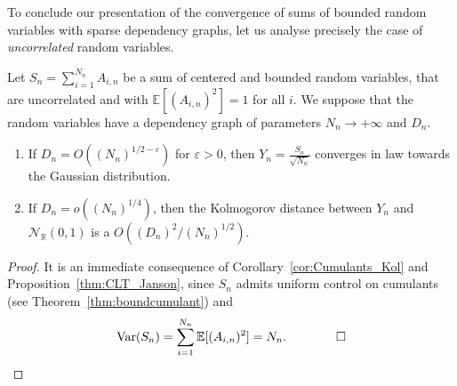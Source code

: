 \documentclass[envcountsame]{svmult}
\newcommand{\R}{\mathbb{R}}
\newcommand{\esper}{\mathbb{E}}
\newcommand{\eps}{\varepsilon}
\newcommand{\var}{\mathrm{Var}}
\newcommand{\gauss}{\mathcal{N}_{\R}(0,1)}
\begin{document}
To conclude our presentation of the convergence of sums of bounded random variables with sparse dependency graphs, let us analyse precisely the case of \emph{uncorrelated} random variables.
\begin{corollary}\label{cor:uncorrelated}
Let $S_n=\sum_{i=1}^{N_n} A_{i,n}$ be a sum of centered and bounded random variables, that are uncorrelated and with $\esper[(A_{i,n})^2]=1$ for all $i$. We suppose that the random variables have a dependency graph of parameters $N_n \to +\infty$ and $D_n$.
\begin{enumerate}
 	\item If $D_n = O((N_n)^{1/2-\eps})$ for $\eps>0$, then $Y_n=\frac{S_n}{\sqrt{N_n}}$ converges in law towards the Gaussian distribution. 
 	\item If $D_n = o((N_n)^{1/4})$, then the Kolmogorov distance between $Y_n$ and $\gauss$ is a $O((D_n)^2/(N_n)^{1/2})$.
 \end{enumerate}  
\end{corollary}

\begin{proof}
  It is an immediate consequence of Corollary~\ref{cor:Cumulants_Kol} and Proposition~\ref{thm:CLT_Janson},
  since $S_n$ admits uniform control on cumulants (see Theorem~\ref{thm:boundcumulant})
  and
  \begin{equation*}
  \var(S_n) = \sum_{i=1}^{N_n} \esper[(A_{i,n})^2] = N_n.\qquad\qed
  \end{equation*}
\end{proof}
\end{document}
